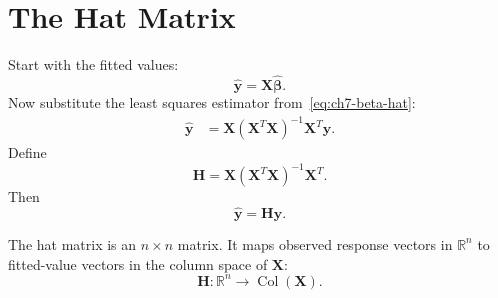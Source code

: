 \section{The Hat Matrix}

Start with the fitted values:
\begin{equation}
  \widehat{\mathbf{y}}=\mathbf{X}\widehat{\boldsymbol{\beta}}.
\end{equation}
Now substitute the least squares estimator from~\eqref{eq:ch7-beta-hat}:
\begin{align}
  \widehat{\mathbf{y}}
  &=\mathbf{X}(\mathbf{X}^T\mathbf{X})^{-1}\mathbf{X}^T\mathbf{y}.
\end{align}
Define
\begin{equation}
  \boxed{\mathbf{H}=\mathbf{X}(\mathbf{X}^T\mathbf{X})^{-1}\mathbf{X}^T.}
  \label{eq:ch7-hat-matrix}
\end{equation}
Then
\begin{equation}
  \boxed{\widehat{\mathbf{y}}=\mathbf{H}\mathbf{y}.}
  \label{eq:ch7-yhat-hy}
\end{equation}

The hat matrix is an \(n\times n\) matrix.  It maps observed response vectors in \(\mathbb{R}^n\) to fitted-value vectors in the column space of \(\mathbf{X}\):
\begin{equation}
  \mathbf{H}:\mathbb{R}^n\to \operatorname{Col}(\mathbf{X}).
\end{equation}

